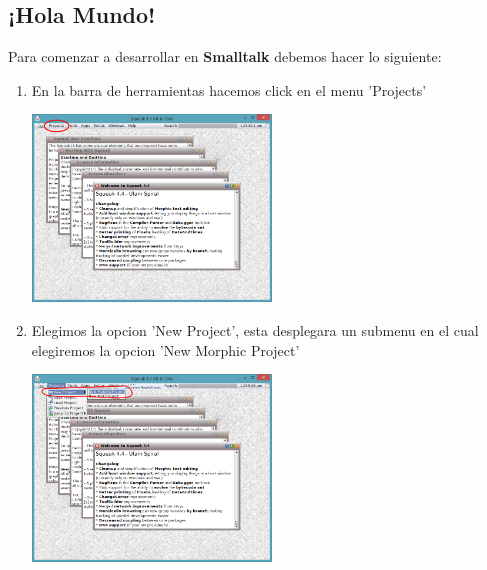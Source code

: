 \documentclass[11pt]{article}
\begin{document}
\subsection{\textbf{¡Hola Mundo!}}
Para comenzar a desarrollar en \textbf{Smalltalk} debemos hacer lo siguiente:
\begin{enumerate}
\item
En la barra de herramientas hacemos click en el menu 'Projects'
				\begin{center}
				\includegraphics[width=0.5\textwidth]{images/barra_herramientas}
				\end{center}

\item
Elegimos la opcion 'New Project', esta desplegara un submenu en el cual elegiremos la opcion 'New Morphic Project'
				\begin{center}
				\includegraphics[width=0.5\textwidth]{images/new_project}
				\end{center}


\end{enumerate}
\end{document}
